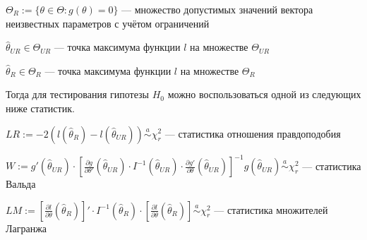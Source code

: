\documentclass[pdftex,11pt,openany]{book}\usepackage[]{graphicx}\usepackage[]{color}
\begin{document}
\begin{problemtext}
$\Theta_{R} := \{ \theta \in \Theta: g(\theta) = 0\}$ --- множество допустимых значений вектора неизвестных параметров с учётом ограничений

$\hat{\theta}_{UR} \in \Theta_{UR}$ --- точка максимума функции $l$ на множестве $\Theta_{UR}$

$\hat{\theta}_{R} \in \Theta_{R}$ --- точка максимума функции $l$ на множестве $\Theta_{R}$

Тогда для тестирования гипотезы $H_0$ можно воспользоваться одной из следующих ниже статистик.

$LR := -2(l(\hat{\theta}_{R}) - l(\hat{\theta}_{UR})) \overset{a}{\sim} \chi^2_r$ --- статистика отношения правдоподобия

$W := g'(\hat{\theta}_{UR}) \cdot \left[ \frac{\partial g}{\partial \theta'}(\hat{\theta}_{UR}) \cdot I^{-1}(\hat{\theta}_{UR}) \cdot \frac{\partial g'}{\partial \theta}(\hat{\theta}_{UR}) \right]^{-1} g(\hat{\theta}_{UR}) \overset{a}{\sim} \chi^2_r$ --- статистика Вальда

$LM := \left[ \frac{\partial l}{\partial \theta}(\hat{\theta}_{R}) \right]' \cdot I^{-1}(\hat{\theta}_{R}) \cdot \left[ \frac{\partial l}{\partial \theta}(\hat{\theta}_{R}) \right] \overset{a}{\sim} \chi^2_r$ --- статистика множителей Лагранжа
\end{problemtext}
\end{document}
